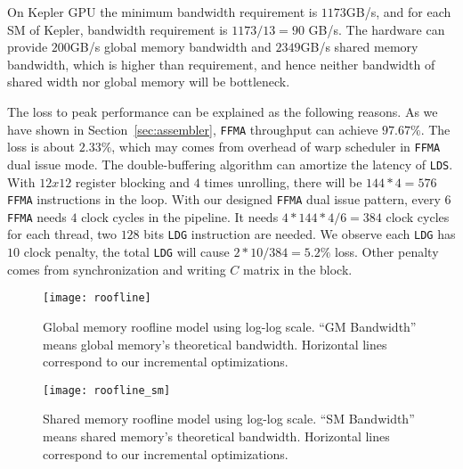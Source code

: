 On Kepler GPU the minimum bandwidth requirement is $1173$GB/s, and for each SM of Kepler, bandwidth requirement is
$1173/13=90$ GB/s.
The hardware can provide $200$GB/s global memory bandwidth and $2349$GB/s shared memory bandwidth, which is
higher than requirement, and hence neither bandwidth of shared width nor global memory will be bottleneck.

The loss to peak performance can be explained as the following reasons. As we have shown in 
Section~\ref{sec:assembler}, {\tt FFMA} throughput can achieve $97.67\%$. The loss is about $2.33\%$, which may comes 
from overhead of warp scheduler in {\tt FFMA} dual issue mode. The double-buffering algorithm can amortize the latency 
of {\tt LDS}.
With $12x12$ register blocking and $4$ times unrolling, there will be $144*4=576$ {\tt FFMA} instructions in the loop.
With our designed {\tt FFMA} dual issue pattern, every $6$ {\tt FFMA} needs $4$ clock cycles in the pipeline.
It needs $4*144*4/6=384$ clock cycles for each thread,  two $128$ bits {\tt LDG} instruction are needed.
We observe each {\tt LDG} has $10$ clock penalty, the total {\tt LDG} will cause $2*10/384 = 5.2\%$ loss. Other penalty 
comes from synchronization and writing $C$ matrix in the block.

\begin{figure}[htbp]
\begin{center}
\texttt{[image: roofline]}
    \caption{Global memory roofline model using log-log scale. ``GM Bandwidth'' means global memory's theoretical bandwidth. Horizontal lines correspond to our incremental optimizations.}
\label{fig:roofline}
\end{center}
\end{figure}

\begin{figure}[htbp]
\begin{center}
\texttt{[image: roofline\_sm]}
    \caption{Shared memory roofline model using log-log scale. ``SM Bandwidth'' means shared memory's theoretical bandwidth. Horizontal lines correspond to our incremental optimizations.}
\label{fig:roofline}
\end{center}
\end{figure}
